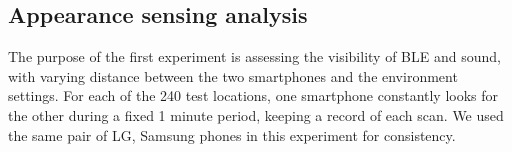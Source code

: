 \documentclass[graybox]{svmult}
\begin{document}







\subsection{Appearance sensing analysis}
\label{sec:appearance}
The purpose of the first experiment is assessing the visibility of BLE and sound, with varying distance between the two smartphones and the environment settings. For each of the 240 test locations, one smartphone constantly looks for the other during a fixed 1 minute period, keeping a record of each scan. We used the same pair of LG, Samsung phones in this experiment for consistency.
\end{document}
